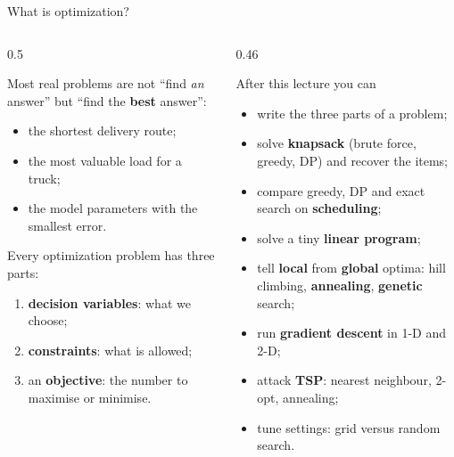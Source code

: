 \documentclass[aspectratio=169,10pt]{beamer}
\begin{document}
\begin{frame}[plain]\titlepage\end{frame}

\begin{frame}{What is optimization?}
\begin{columns}[T]
\begin{column}{0.5\textwidth}
{\small
Most real problems are not ``find \emph{an} answer'' but ``find the \textbf{best} answer'':
\begin{itemize}\setlength\itemsep{3pt}
\item the shortest delivery route;
\item the most valuable load for a truck;
\item the model parameters with the smallest error.
\end{itemize}
\vspace{1mm}
Every optimization problem has three parts:
\begin{enumerate}\setlength\itemsep{2pt}
\item \textbf{decision variables}: what we choose;
\item \textbf{constraints}: what is allowed;
\item an \textbf{objective}: the number to maximise or minimise.
\end{enumerate}}
\end{column}
\begin{column}{0.46\textwidth}
\begin{block}{After this lecture you can}
{\small
\begin{itemize}\setlength\itemsep{1pt}
\item write the three parts of a problem;
\item solve \textbf{knapsack} (brute force, greedy, DP) and recover the items;
\item compare greedy, DP and exact search on \textbf{scheduling};
\item solve a tiny \textbf{linear program};
\item tell \textbf{local} from \textbf{global} optima: hill climbing, \textbf{annealing}, \textbf{genetic} search;
\item run \textbf{gradient descent} in 1-D and 2-D;
\item attack \textbf{TSP}: nearest neighbour, 2-opt, annealing;
\item tune settings: grid versus random search.
\end{itemize}}
\end{block}
\end{column}
\end{columns}
\end{frame}
\end{document}
